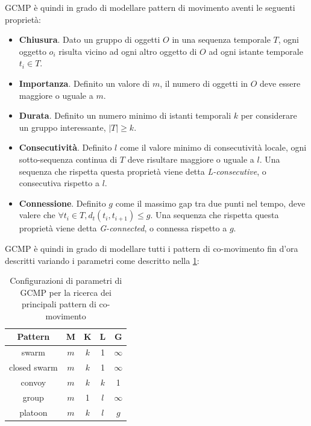 GCMP è quindi in grado di modellare pattern di movimento aventi le seguenti proprietà:

\begin{itemize}
    \item \textbf{Chiusura}.
    Dato un gruppo di oggetti \(O\) in una sequenza temporale \(T\), ogni oggetto \(o_i\) risulta vicino ad ogni altro oggetto di \(O\) ad ogni istante temporale \(t_i \in T\).
    
    \item \textbf{Importanza}.
    Definito un valore di \(m\), il numero di oggetti in \(O\) deve essere maggiore o uguale a \(m\).
    
    \item \textbf{Durata}.
    Definito un numero minimo di istanti temporali \(k\) per considerare un gruppo interessante, \(|T| \geq k \).
    
    \item \textbf{Consecutività}.
    Definito \(l\) come il valore minimo di consecutività locale, ogni sotto-sequenza continua di \(T\) deve risultare maggiore o uguale a \(l\).
    Una sequenza che rispetta questa proprietà viene detta \textit{L-consecutive}, o consecutiva rispetto a \(l\).
    
    \item \textbf{Connessione}.
    Definito \(g\) come il massimo gap tra due punti nel tempo, deve valere che \( \forall t_i \in T, d_t{(t_i, t_{i + 1}) \leq g}\).
    Una sequenza che rispetta questa proprietà viene detta \textit{G-connected}, o connessa rispetto a \(g\).
\end{itemize}

GCMP è quindi in grado di modellare tutti i pattern di co-movimento fin d'ora descritti variando i parametri come descritto nella \cref{tab:co-movement-pattern-gcmp}:

\begin{table}[H]
    \centering
   \begin{tabular}{||c c c c c||}
 \hline
     Pattern & M & K & L & G \\ [0.4ex] 
 \hline\hline
     swarm & \(m\) & \(k\) & 1 & \(\infty\) \\ 
 \hline
    closed swarm & \(m\) & \(k\) & 1 & \(\infty\) \\ 
 \hline
     convoy & \(m\) & \(k\) & \(k\) & 1 \\ 
  \hline
     group & \(m\) & 1 & \(l\) & \(\infty\) \\
  \hline
    platoon & \(m\) & \(k\) & \(l\) & \(g\) \\ 
 \hline
\end{tabular}
    \caption{Configurazioni di parametri di GCMP per la ricerca dei principali pattern di co-movimento}
    \label{tab:co-movement-pattern-gcmp}
\end{table}


